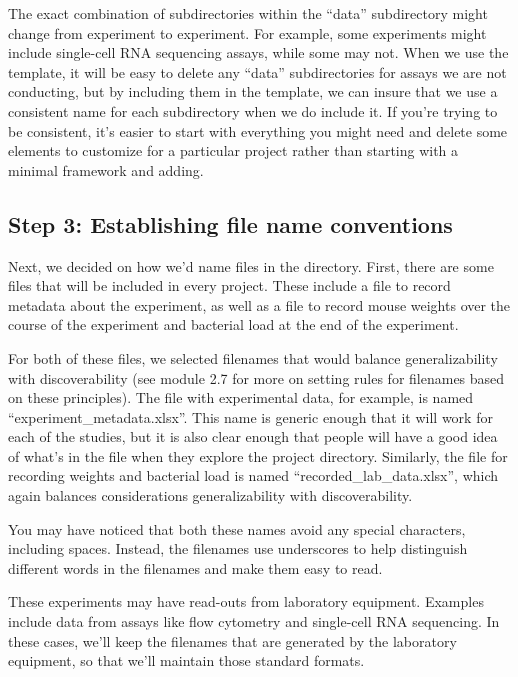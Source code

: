 \documentclass[]{tufte-book}
\begin{document}
The exact combination of subdirectories within the ``data'' subdirectory might
change from experiment to experiment. For example, some experiments might
include single-cell RNA sequencing assays, while some may not. When we use the
template, it will be easy to delete any ``data'' subdirectories for assays we are
not conducting, but by including them in the template, we can insure that we use
a consistent name for each subdirectory when we do include it. If you're
trying to be consistent, it's easier to start with everything you might need
and delete some elements to customize for a particular project rather than
starting with a minimal framework and adding.

\subsection{Step 3: Establishing file name conventions}\label{step-3-establishing-file-name-conventions}

Next, we decided on how we'd name files in the directory. First, there are some
files that will be included in every project. These include a file to record
metadata about the experiment, as well as a file to record mouse weights over
the course of the experiment and bacterial load at the end of the experiment.

For both of these files, we selected filenames that would balance
generalizability with discoverability (see module 2.7 for more on setting rules
for filenames based on these principles). The file with experimental data, for
example, is named ``experiment\_metadata.xlsx''. This name is generic enough that
it will work for each of the studies, but it is also clear enough that people
will have a good idea of what's in the file when they explore the project
directory. Similarly, the file for recording weights and bacterial load is named
``recorded\_lab\_data.xlsx'', which again balances considerations generalizability
with discoverability.

You may have noticed that both these names avoid any special characters,
including spaces. Instead, the filenames use underscores to help distinguish
different words in the filenames and make them easy to read.

These experiments may have read-outs from laboratory equipment. Examples include
data from assays like flow cytometry and single-cell RNA sequencing. In these
cases, we'll keep the filenames that are generated by the laboratory equipment,
so that we'll maintain those standard formats.
\end{document}
